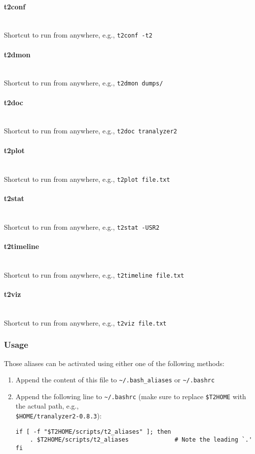 \documentclass[documentation]{subfiles}
\begin{document}
\paragraph{t2conf}~\\
Shortcut to run  from anywhere, e.g., {\tt t2conf -t2}
\paragraph{t2dmon}~\\
Shortcut to run  from anywhere, e.g., {\tt t2dmon dumps/}
\paragraph{t2doc}~\\
Shortcut to run  from anywhere, e.g., {\tt t2doc tranalyzer2}
\paragraph{t2plot}~\\
Shortcut to run  from anywhere, e.g., {\tt t2plot file.txt}
\paragraph{t2stat}~\\
Shortcut to run  from anywhere, e.g., {\tt t2stat -USR2}
\paragraph{t2timeline}~\\
Shortcut to run  from anywhere, e.g., {\tt t2timeline file.txt}
\paragraph{t2viz}~\\
Shortcut to run  from anywhere, e.g., {\tt t2viz file.txt}

\subsubsection{Usage}
Those aliases can be activated using either one of the following methods:

\begin{enumerate}
    \item Append the content of this file to {\tt\textasciitilde{}/.bash\_aliases} or {\tt\textasciitilde{}/.bashrc}
    \item Append the following line to {\tt\textasciitilde{}/.bashrc} (make sure to replace {\tt\$T2HOME}
          with the actual path, e.g.,\\{\tt\$HOME/tranalyzer2-0.8.3}):
\begin{lstlisting}
if [ -f "$T2HOME/scripts/t2_aliases" ]; then
    . $T2HOME/scripts/t2_aliases             # Note the leading `.'
fi
\end{lstlisting}
\end{enumerate}
\end{document}
